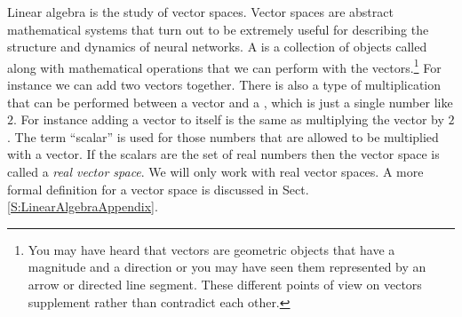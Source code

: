     Linear algebra is the study of vector spaces. Vector spaces are abstract
mathematical systems that turn out to be extremely useful for describing the 
structure and dynamics of neural networks. A  is a 
collection of objects called  along with mathematical 
operations that we can perform with the vectors.\footnote{You may have heard 
that vectors are geometric objects that have a magnitude and a direction or you 
may have seen them represented by an arrow or directed line segment. These 
different points of view on vectors supplement rather than contradict each 
other.}  For instance we can add two vectors together. There is also a type of 
multiplication that can be performed between a vector and a , which is just a single number like $2$. 
For instance adding a vector to itself is the same as multiplying the vector by 
$2$. The term ``scalar'' is used for those numbers that are allowed to be 
multiplied with a vector. If the scalars are the set of real numbers then the 
vector space is called a {\em real vector space}. We will only work with real
vector spaces. A more formal definition for a vector space is discussed in 
Sect. \ref{S:LinearAlgebraAppendix}. 

